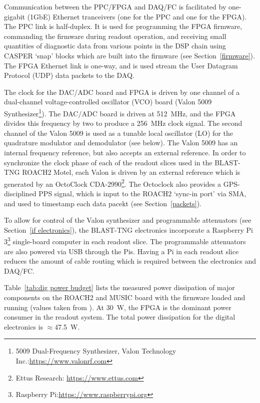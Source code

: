 Communication between the PPC/FPGA and DAQ/FC is facilitated by one-gigabit (1GbE) Ethernet tranceivers (one for the PPC and one for the FPGA). The PPC link is half-duplex. It is used for programming the FPGA firmware, commanding the firmware during readout operation, and receiving small quantities of diagnostic data from various points in the DSP chain using CASPER `snap' blocks which are built into the firmware (see Section~\ref{firmware}). The FPGA Ethernet link is one-way, and is used stream the User Datagram Protocol (UDP) data packets to the DAQ.

The clock for the DAC/ADC board and FPGA is driven by one channel of a dual-channel voltage-controlled oscillator (VCO) board (Valon 5009 Synthesizer\footnote{5009 Dual-Frequency Synthesizer, Valon Technology Inc.:\url{https://www.valonrf.com}}). The DAC/ADC board is driven at 512~MHz, and the FPGA divides this frequency by two to produce a 256~MHz clock signal. The second channel of the Valon 5009 is used as a tunable local oscillator (LO) for the quadrature modulator and demodulator (see below). The Valon 5009 has an internal frequency reference, but also accepts an external reference. In order to synchronize the clock phase of each of the readout slices used in the BLAST-TNG ROACH2 Motel, each Valon is driven by an external reference which is generated by an
OctoClock CDA-2990\footnote{Ettus Research: \url{https://www.ettus.com}}. The Octoclock also provides a GPS-disciplined PPS signal, which is input to the ROACH2 `sync-in port' via SMA, and used to timestamp each data pacekt (see Section~\ref{packets}).

To allow for control of the Valon synthesizer and programmable attenuators (see Section~\ref{if electronics}), the BLAST-TNG electronics incorporate a Raspberry Pi 3\footnote{Raspberry Pi:\url{https://www.raspberrypi.org}} single-board computer in each readout slice. The programmable attenuators are also powered via USB through the Pis. Having a Pi in each readout slice reduces the amount of cable routing which is required between the electronics and DAQ/FC.

Table~\ref{tab:dig power budget} lists the measured power dissipation of major components on the ROACH2 and MUSIC board with the firmware loaded and running (values taken from \citet{gordon2016}). At 30~W, the FPGA is the dominant power consumer in the readout system. The total power dissipation for the digital electronics is $\approx$47.5~W.

